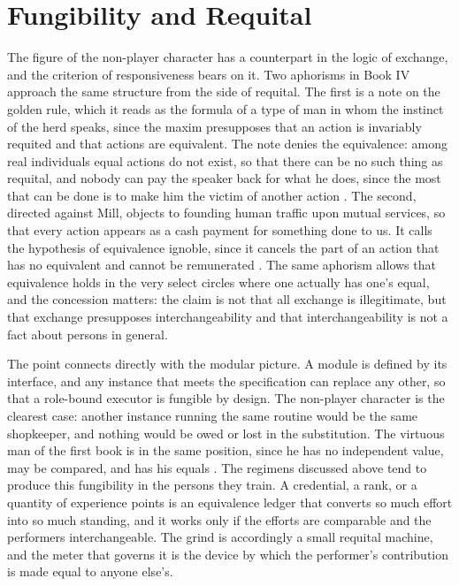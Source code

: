 \documentclass[11pt]{article}
\begin{document}
\section{Fungibility and Requital}

The figure of the non-player character has a counterpart in the logic of exchange, and the criterion of responsiveness bears on it. Two aphorisms in Book IV approach the same structure from the side of requital. The first is a note on the golden rule, which it reads as the formula of a type of man in whom the instinct of the herd speaks, since the maxim presupposes that an action is invariably requited and that actions are equivalent. The note denies the equivalence: among real individuals equal actions do not exist, so that there can be no such thing as requital, and nobody can pay the speaker back for what he does, since the most that can be done is to make him the victim of another action \cite[Aph.\ 925]{wtp2}. The second, directed against Mill, objects to founding human traffic upon mutual services, so that every action appears as a cash payment for something done to us. It calls the hypothesis of equivalence ignoble, since it cancels the part of an action that has no equivalent and cannot be remunerated \cite[Aph.\ 926]{wtp2}. The same aphorism allows that equivalence holds in the very select circles where one actually has one's equal, and the concession matters: the claim is not that all exchange is illegitimate, but that exchange presupposes interchangeability and that interchangeability is not a fact about persons in general.

The point connects directly with the modular picture. A module is defined by its interface, and any instance that meets the specification can replace any other, so that a role-bound executor is fungible by design. The non-player character is the clearest case: another instance running the same routine would be the same shopkeeper, and nothing would be owed or lost in the substitution. The virtuous man of the first book is in the same position, since he has no independent value, may be compared, and has his equals \cite[Aph.\ 319]{wtp1}. The regimens discussed above tend to produce this fungibility in the persons they train. A credential, a rank, or a quantity of experience points is an equivalence ledger that converts so much effort into so much standing, and it works only if the efforts are comparable and the performers interchangeable. The grind is accordingly a small requital machine, and the meter that governs it is the device by which the performer's contribution is made equal to anyone else's.
\end{document}
